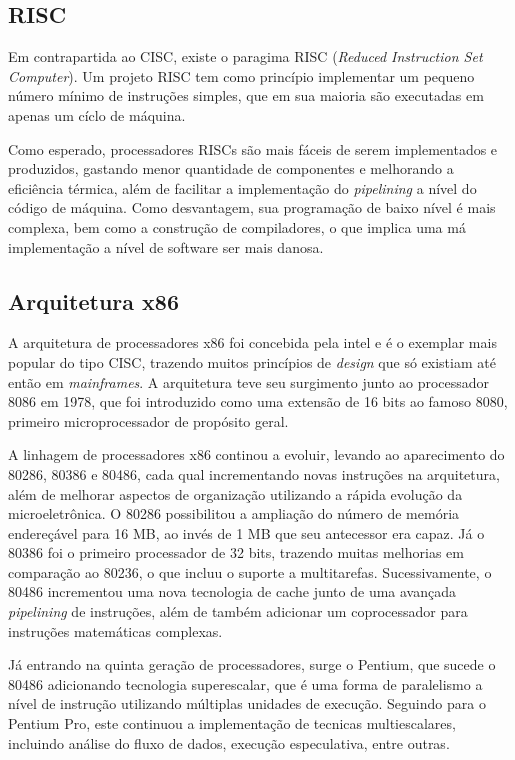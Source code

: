 \documentclass{article}
\begin{document}
\subsection{RISC}
Em contrapartida ao CISC, existe o paragima RISC (\textit{Reduced Instruction
  Set Computer}). Um projeto RISC tem como princípio implementar um pequeno
número mínimo de instruções simples, que em sua maioria são executadas em
apenas um cíclo de máquina.

Como esperado, processadores RISCs são mais fáceis de serem implementados e
produzidos, gastando menor quantidade de componentes e melhorando a eficiência
térmica, além de facilitar a implementação do \textit{pipelining} a nível do
código de máquina. Como desvantagem, sua programação de baixo nível é mais
complexa, bem como a construção de compiladores, o que implica uma má
implementação a nível de software ser mais danosa.

\subsection{Arquitetura x86} 
A arquitetura de processadores x86 foi concebida pela intel e é o exemplar mais
popular do tipo CISC, trazendo muitos princípios de \textit{design} que só
existiam até então em \textit{mainframes}. A arquitetura teve seu surgimento
junto ao processador 8086 em 1978, que foi introduzido como uma extensão de 16
bits ao famoso 8080, primeiro microprocessador de propósito geral.

A linhagem de processadores x86 continou a evoluir, levando ao aparecimento do
80286, 80386 e 80486, cada qual incrementando novas instruções na arquitetura,
além de melhorar aspectos de organização utilizando a rápida evolução da
microeletrônica. O 80286 possibilitou a ampliação do número de memória
endereçável para 16 MB, ao invés de 1 MB que seu antecessor era capaz. Já o
80386 foi o primeiro processador de 32 bits, trazendo muitas melhorias em
comparação ao 80236, o que incluu o suporte a multitarefas. Sucessivamente,
o 80486 incrementou uma nova tecnologia de cache junto de uma avançada
\textit{pipelining} de instruções, além de também adicionar um coprocessador
para instruções matemáticas complexas.

Já entrando na quinta geração de processadores, surge o Pentium, que sucede o
80486 adicionando tecnologia superescalar, que é uma forma de paralelismo a
nível de instrução utilizando múltiplas unidades de execução. Seguindo para
o Pentium Pro, este continuou a implementação de tecnicas multiescalares,
incluindo análise do fluxo de dados, execução especulativa, entre outras.
\end{document}
